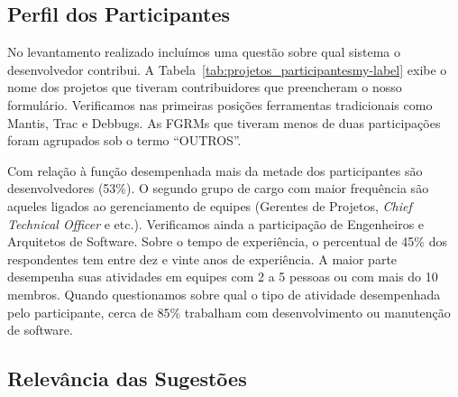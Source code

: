 \subsection{Perfil dos Participantes}\label{sub:sug_melhorias_resultados_perfil_dos_participantes}

No levantamento realizado incluímos uma questão sobre qual sistema o
desenvolvedor contribui. A Tabela~\ref{tab:projetos_participantesmy-label}
exibe o nome dos projetos que tiveram contribuidores que preencheram o nosso
formulário. Verificamos nas primeiras posições ferramentas tradicionais como
Mantis, Trac e Debbugs. As FGRMs que tiveram menos de duas participações foram
agrupados sob o termo ``OUTROS''.

\begin{table}[htpb]
\centering
{}
\caption{Projetos que os participantes contribuem.}\label{tab:projetos_participantesmy-label}
\end{table}

Com relação à função desempenhada mais da metade dos participantes são
desenvolvedores (53\%). O segundo grupo de cargo com maior frequência são
aqueles ligados ao gerenciamento de equipes (Gerentes de Projetos,
\textit{Chief Technical Officer} e etc.). Verificamos ainda a participação de
Engenheiros e Arquitetos de Software. Sobre o tempo de experiência, o
percentual de 45\% dos respondentes tem entre dez e vinte anos de experiência.
A maior parte desempenha suas atividades em equipes com 2 a 5 pessoas ou com
mais do 10 membros. Quando questionamos sobre qual o tipo de atividade
desempenhada pelo participante, cerca de 85\% trabalham com desenvolvimento ou
manutenção de software.

\subsection{Relevância das Sugestões}\label{sub:sug_melhorias_resultados_relevancia}

